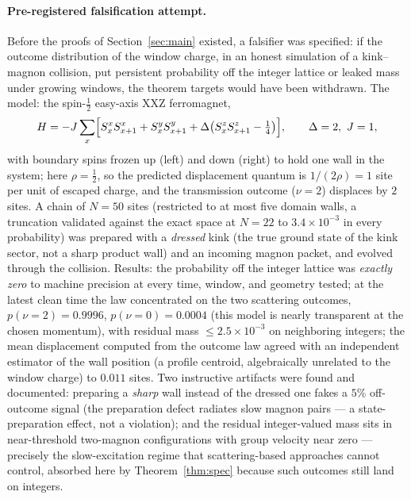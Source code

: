 \documentclass[11pt]{article}
\theoremstyle{definition}
\theoremstyle{remark}
\begin{document}
\paragraph{Pre-registered falsification attempt.}
Before the proofs of Section~\ref{sec:main} existed, a falsifier was
specified: if the outcome distribution of the window charge, in an honest
simulation of a kink--magnon collision, put persistent probability off the
integer lattice or leaked mass under growing windows, the theorem targets
would have been withdrawn.  The model: the spin-$\tfrac12$ easy-axis XXZ
ferromagnet,
\[
H=-J\sum_x\Bigl[S^x_xS^x_{x+1}+S^y_xS^y_{x+1}
+\Delta\bigl(S^z_xS^z_{x+1}-\tfrac14\bigr)\Bigr],
\qquad \Delta=2,\ J=1,
\]
with boundary spins frozen up (left) and down (right) to hold one wall in
the system; here $\rho=\tfrac12$, so the predicted displacement quantum is
$1/(2\rho)=1$ site per unit of escaped charge, and the transmission outcome
($\nu=2$) displaces by $2$ sites.  A chain of $N=50$ sites (restricted to at
most five domain walls, a truncation validated against the exact space at
$N=22$ to $3.4\times10^{-3}$ in every probability) was prepared with a
\emph{dressed} kink (the true ground state of the kink sector, not a sharp
product wall) and an incoming magnon packet, and evolved through the
collision.  Results: the probability off the integer lattice was
\emph{exactly zero} to machine precision at every time, window, and
geometry tested; at the latest clean time the law concentrated on the two
scattering outcomes, $p(\nu=2)=0.9996$, $p(\nu=0)=0.0004$ (this model is
nearly transparent at the chosen momentum), with residual mass
$\le 2.5\times10^{-3}$ on neighboring integers; the mean displacement
computed from the outcome law agreed with an independent estimator of the
wall position (a profile centroid, algebraically unrelated to the window
charge) to $0.011$ sites.  Two instructive artifacts were found and
documented: preparing a \emph{sharp} wall instead of the dressed one fakes a
$5\%$ off-outcome signal (the preparation defect radiates slow magnon pairs
--- a state-preparation effect, not a violation); and the residual
integer-valued mass sits in near-threshold two-magnon configurations with
group velocity near zero --- precisely the slow-excitation regime that
scattering-based approaches cannot control, absorbed here by
Theorem~\ref{thm:spec} because such outcomes still land on integers.
\end{document}
